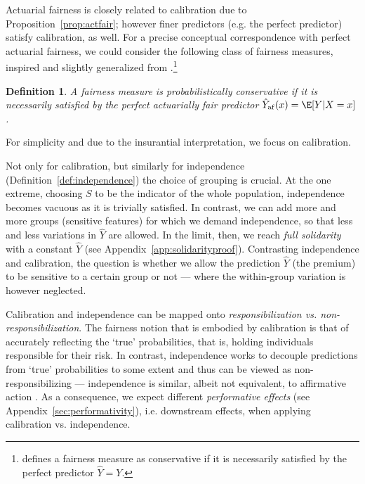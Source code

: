 \documentclass[11pt]{article} %
\makeatletter
\newcommand*{\eg}{e.g.\@\xspace}
\newcommand*{\ie}{i.e.\@\xspace}
\newcommand{\actfairpred}{\hat{Y}_{\mathrm{af}}}
\newtheorem{definition}[theorem]{Definition}
\makeatother
\begin{document}
Actuarial fairness is closely related to calibration due to Proposition~\ref{prop:actfair}; however finer predictors (\eg the perfect predictor) satisfy calibration, as well. For a precise conceptual correspondence with perfect actuarial fairness, we could consider the following class of fairness measures, inspired and slightly generalized from \citet{raz2021group}.\footnote{\citet{raz2021group} defines a fairness measure as conservative if it is necessarily satisfied by the perfect predictor $\hat{Y}=Y$.}
\begin{definition}
    A fairness measure is probabilistically conservative if it is necessarily satisfied by the perfect actuarially fair predictor $\actfairpred(x)=\E[Y|X=x]$.
\end{definition}
For simplicity and due to the insurantial interpretation, we focus on calibration.

Not only for calibration, but similarly for independence (Definition~\ref{def:independence}) the choice of grouping is crucial. At the one extreme, choosing $S$ to be the indicator of the whole population, independence becomes vacuous as it is trivially satisfied. In contrast, we can add more and more groups (sensitive features) for which we demand independence, so that less and less variations in $\hat{Y}$ are allowed. In the limit, then, we reach \textit{full solidarity} with a constant $\hat{Y}$ (see Appendix~\ref{app:solidarityproof}).
Contrasting independence and calibration, the question is whether we allow the prediction $\hat{Y}$ (the premium) to be sensitive to a certain group or not --- where the within-group variation is however neglected. 


Calibration and independence can be mapped onto \textit{responsibilization vs. non-responsibilization}. The fairness notion that is embodied by calibration is that of accurately reflecting the `true' probabilities, that is, holding individuals responsible for their risk.
In contrast, independence works to decouple predictions from `true' probabilities to some extent and thus can be viewed as non-responsibilizing --- independence is similar, albeit not equivalent, to affirmative action \citep{raz2021group}. As a consequence, we expect different \textit{performative effects} (see Appendix~\ref{sec:performativity}), \ie downstream effects, when applying calibration vs. independence. 
\end{document}
